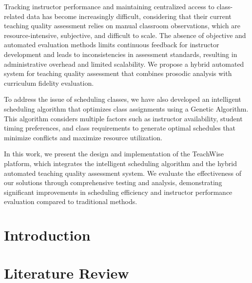 \documentclass[12pt,twosided]{report}
\begin{document}
Tracking instructor performance and maintaining centralized access to class-related data has become increasingly difficult, considering that their current teaching quality assessment relies on manual classroom observations, which are resource-intensive, subjective, and difficult to scale. The absence of objective and automated evaluation methods limits continuous feedback for instructor development and leads to inconsistencies in assessment standards, resulting in administrative overhead and limited scalability. We propose a hybrid automated system for
teaching quality assessment that combines prosodic analysis
with curriculum fidelity evaluation.

To address the issue of scheduling classes, we have also developed an intelligent scheduling algorithm that optimizes class assignments using a Genetic Algorithm. This algorithm considers multiple factors such as instructor availability, student timing preferences, and class requirements to generate optimal schedules that minimize conflicts and maximize resource utilization.

In this work, we present the design and implementation of the TeachWise platform, which integrates the intelligent scheduling algorithm and the hybrid automated teaching quality assessment system. We evaluate the effectiveness of our solutions through comprehensive testing and analysis, demonstrating significant improvements in scheduling efficiency and instructor performance evaluation compared to traditional methods.

\tableofcontents
\listoffigures
\listoftables

\chapter{Introduction}
\label{chap:intro}


\chapter{Literature Review}
\label{chap:lit}

\end{document}
